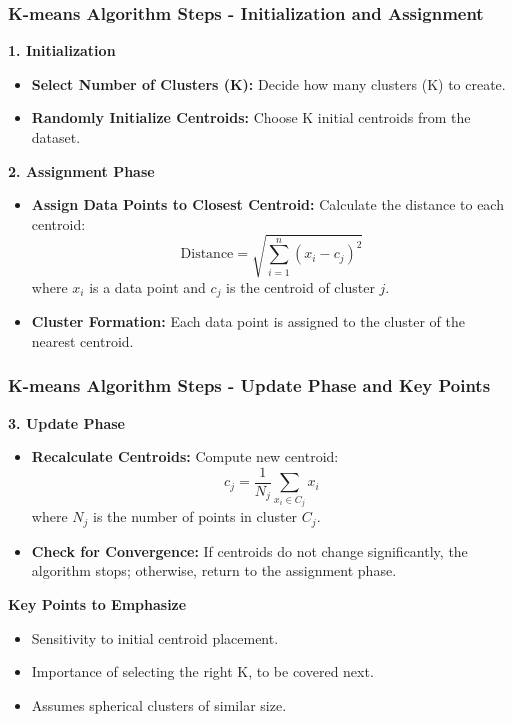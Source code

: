 \documentclass[aspectratio=169]{beamer}
\begin{document}
\begin{frame}[fragile]
    \frametitle{K-means Algorithm Steps - Initialization and Assignment}
    
    \textbf{1. Initialization}
    \begin{itemize}
        \item \textbf{Select Number of Clusters (K):} Decide how many clusters (K) to create.
        \item \textbf{Randomly Initialize Centroids:} Choose K initial centroids from the dataset.
    \end{itemize}
    
    \textbf{2. Assignment Phase}
    \begin{itemize}
        \item \textbf{Assign Data Points to Closest Centroid:} Calculate the distance to each centroid:
        \begin{equation}
            \text{Distance} = \sqrt{\sum_{i=1}^{n}(x_i - c_j)^2}
        \end{equation}
        where \(x_i\) is a data point and \(c_j\) is the centroid of cluster \(j\).
        
        \item \textbf{Cluster Formation:} Each data point is assigned to the cluster of the nearest centroid.
    \end{itemize}
\end{frame}

\begin{frame}[fragile]
    \frametitle{K-means Algorithm Steps - Update Phase and Key Points}
    
    \textbf{3. Update Phase}
    \begin{itemize}
        \item \textbf{Recalculate Centroids:} Compute new centroid:
        \begin{equation}
            c_j = \frac{1}{N_j} \sum_{x_i \in C_j} x_i
        \end{equation}
        where \(N_j\) is the number of points in cluster \(C_j\).
        
        \item \textbf{Check for Convergence:} If centroids do not change significantly, the algorithm stops; otherwise, return to the assignment phase.
    \end{itemize}
    
    \textbf{Key Points to Emphasize}
    \begin{itemize}
        \item Sensitivity to initial centroid placement.
        \item Importance of selecting the right K, to be covered next.
        \item Assumes spherical clusters of similar size.
    \end{itemize}
\end{frame}
\end{document}

